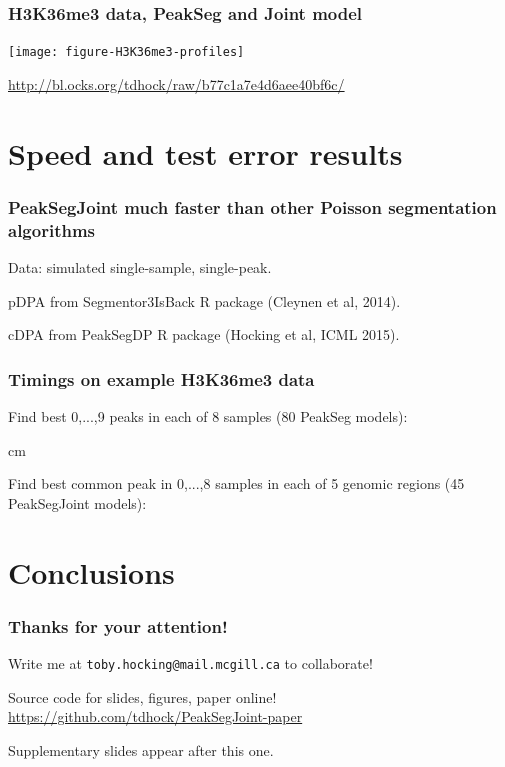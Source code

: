 \documentclass{beamer}
\begin{document}
\begin{frame}
  \frametitle{H3K36me3 data, PeakSeg and Joint model}

  \texttt{[image: figure-H3K36me3-profiles]}

  \url{http://bl.ocks.org/tdhock/raw/b77c1a7e4d6aee40bf6c/}
\end{frame}

\section{Speed and test error results}

\begin{frame}
  \frametitle{PeakSegJoint much faster than other Poisson
    segmentation algorithms}

  Data: simulated single-sample, single-peak.

   

  pDPA from Segmentor3IsBack R package (Cleynen et al, 2014).

  cDPA from PeakSegDP R package (Hocking et al, ICML 2015).

\end{frame}

\begin{frame}
  \frametitle{Timings on example H3K36me3 data}

  \small

  Find best 0,...,9 peaks in each of 8 samples (80 PeakSeg
  models):

  \scriptsize

  

   cm

  \small

  Find best common peak in 0,...,8 samples in each of 5 genomic
  regions (45 PeakSegJoint models):

  \scriptsize

  

\end{frame}

\section{Conclusions}

\begin{frame}
  \frametitle{Thanks for your attention!}
  Write me at \alert{\texttt{toby.hocking@mail.mcgill.ca}} to collaborate!

  \vskip 1cm

  Source code for slides, figures, paper online!\\
  \small
  \url{https://github.com/tdhock/PeakSegJoint-paper}
  \vskip 1cm

  Supplementary slides appear after this one.

\end{frame}
\end{document}

